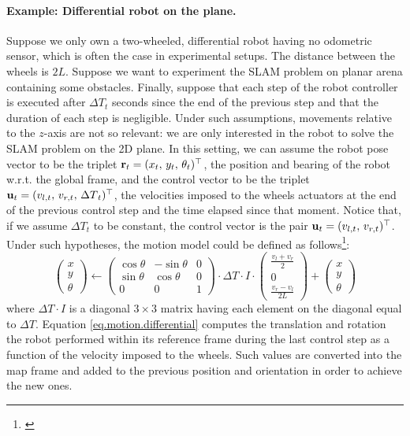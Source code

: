 	\paragraph{Example: Differential robot on the plane.}
		Suppose we only own a two-wheeled, differential robot having no odometric sensor, which is often the case in experimental setups.
		The distance between the wheels is $2L$.
		Suppose we want to experiment the SLAM problem on planar arena containing some obstacles.
		Finally, suppose that each step of the robot controller is executed after ${\Delta T}_t$ seconds since the end of the previous step and that the duration of each step is negligible.
		Under such assumptions, movements relative to the $z$-axis are not so relevant: we are only interested in the robot to solve the SLAM problem on the 2D plane.
		In this setting, we can assume the robot pose vector to be the triplet $\boldsymbol{\mathrm{{r}}}_t = (x_t,\, y_t,\, \theta_t)^\top$, \ie{} the position and bearing of the robot w.r.t. the global frame, and the control vector to be the triplet $\boldsymbol{\mathrm{{u}}}_t = (v_{l,t},\, v_{r,t},\, {\Delta T}_t)^\top$, \ie{} the velocities imposed to the wheels actuators at the end of the previous control step and the time elapsed since that moment.
		Notice that, if we assume ${\Delta T}_t$ to be constant, the control vector is the pair $\boldsymbol{\mathrm{{u}}}_t = (v_{l,t},\, v_{r,t})^\top$.
		Under such hypotheses, the motion model could be defined as follows\footnote{\label{sec.models.alert}\notationAlert}:
		\begin{equation}
			\label{eq.motion.differential}
			\left(\begin{array}{c}
				x \\ y \\ \theta
			\end{array}\right)
			\leftarrow
			\left(\begin{array}{ccc}
				\cos{\theta} & -\sin{\theta} & 0 \\
				\sin{\theta} & \cos{\theta} & 0 \\
				0 & 0 & 1
			\end{array}\right)
			\cdot {\Delta T} \cdot I \cdot
			\left(\begin{array}{c}
				\frac{v_l + v_r}{2} \\ 
				0 \\
				\frac{v_r - v_l}{2L}
			\end{array}\right)
			+
			\left(\begin{array}{c}
				x \\ y \\ \theta
			\end{array}\right)
		\end{equation}
		where ${\Delta T} \cdot I$ is a diagonal $3 \times 3$ matrix having each element on the diagonal equal to ${\Delta T}$.
		Equation \ref{eq.motion.differential} computes the translation and rotation the robot performed within its reference frame during the last control step as a function of the velocity imposed to the wheels. 
		Such values are converted into the map frame and added to the previous position and orientation in order to achieve the new ones. 
		
